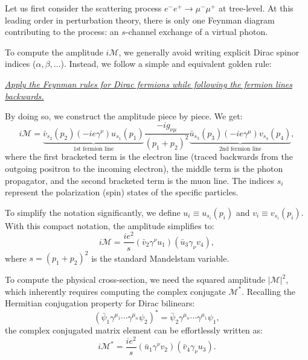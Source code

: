 Let us first consider the scattering process \(e^- e^+ \to \mu^- \mu^+\) at tree-level. At this leading order in perturbation theory, there is only one Feynman diagram contributing to the process: an \(s\)-channel exchange of a virtual photon.


To compute the amplitude \(i\mathcal{M}\), we generally avoid writing explicit Dirac spinor indices (\(\alpha, \beta, \dots\)). Instead, we follow a simple and equivalent golden rule:
\begin{center}
    \uline{\textit{Apply the Feynman rules for Dirac fermions while following the fermion lines backwards.}}
\end{center}

By doing so, we construct the amplitude piece by piece. We get:
\[
    i \mathcal{M} = \underbrace{\bar{v}_{s_2}(p_2) (-i e \gamma^\nu) u_{s_1}(p_1)}_{\text{1st fermion line}} \frac{-i g_{\nu \mu}}{(p_1 + p_2)^2} \underbrace{\bar{u}_{s_3}(p_3) (-i e \gamma^\mu) v_{s_4}(p_4)}_{\text{2nd fermion line}},
\]
where the first bracketed term is the electron line (traced backwards from the outgoing positron to the incoming electron), the middle term is the photon propagator, and the second bracketed term is the muon line. The indices \(s_i\) represent the polarization (spin) states of the specific particles.

To simplify the notation significantly, we define \(u_i \equiv u_{s_i}(p_i)\) and \(v_i \equiv v_{s_i}(p_i)\). With this compact notation, the amplitude simplifies to:
\[
    i \mathcal{M} = \frac{i e^2}{s} \left( \bar{v}_2 \gamma^{\nu} u_1 \right) \left( \bar{u}_3 \gamma_{\nu} v_4 \right),
\]
where \(s = (p_1 + p_2)^2\) is the standard Mandelstam variable.

To compute the physical cross-section, we need the squared amplitude \(|\mathcal{M}|^2\), which inherently requires computing the complex conjugate \(\mathcal{M}^*\). Recalling the Hermitian conjugation property for Dirac bilinears:
\[
    \left( \bar{\psi}_1 \gamma^{\mu_1} \cdots \gamma^{\mu_n} \psi_2 \right)^* = \bar{\psi}_2 \gamma^{\mu_n} \cdots \gamma^{\mu_1} \psi_1,
\]
the complex conjugated matrix element can be effortlessly written as:
\[
    i \mathcal{M}^* = \frac{i e^2}{s} \left( \bar{u}_1 \gamma^{\nu} v_2 \right) \left( \bar{v}_4 \gamma_{\nu} u_3 \right).
\]

